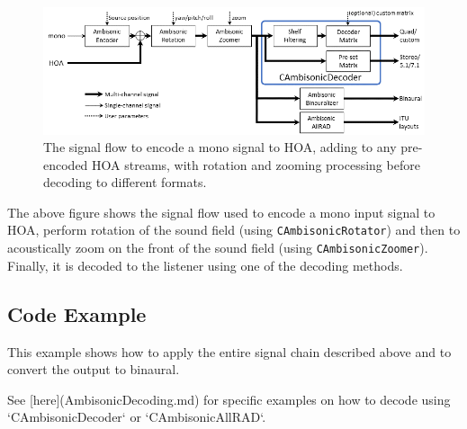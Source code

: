 \documentclass[12pt]{report}
\newcommand{\code}[1]{\texttt{#1}}
\begin{document}
\begin{figure}
    \centering
    \includegraphics[width = \textwidth]{figures/AmbisonicSignalFlow.png}
    \caption{The signal flow to encode a mono signal to HOA, adding to any pre-encoded HOA streams, with rotation and zooming processing before decoding to different formats.}
    \label{fig:ambi_signal_flow}
\end{figure}

The above figure shows the signal flow used to encode a mono input signal to HOA, perform rotation of the sound field (using \code{CAmbisonicRotator}) and then to acoustically zoom on the front of the sound field (using \code{CAmbisonicZoomer}).
Finally, it is decoded to the listener using one of the decoding methods.

\subsection{Code Example}

This example shows how to apply the entire signal chain described above and to convert the output to binaural.

See [here](AmbisonicDecoding.md) for specific examples on how to decode using `CAmbisonicDecoder` or `CAmbisonicAllRAD`.
\end{document}
